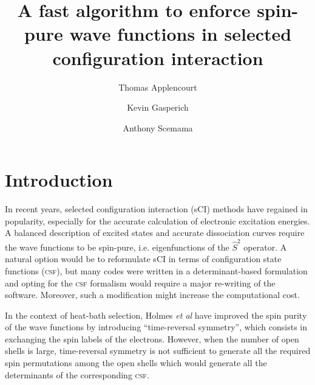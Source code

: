 \documentclass[aip,jcp,reprint,showkeys]{revtex4-1}
\newcommand{\stwo}{\hat{S}^2}
\newcommand{\csf}{\textsc{csf}}
\begin{document}
\title{A fast algorithm to enforce spin-pure wave functions in selected configuration interaction}

\author{Thomas Applencourt}
\author{Kevin Gasperich}
\author{Anthony Scemama}

\begin{abstract}
\end{abstract}


\maketitle

\section{Introduction}

In recent years, selected configuration interaction (sCI) methods have regained in
popularity,\cite{Greer_1998,Stampfuss_2005,Bytautas_2009,Booth_2009,Giner_2013,Buenker_2014,Holmes_2016,Ohtsuka_2017,Coe_2018}
especially for the accurate calculation of electronic excitation
energies.\cite{Coe_2013,Schriber_2017,Holmes_2017,Loos_2018,Scemama_2018,Dash_2018}
A balanced description of excited states and accurate dissociation curves require
the wave functions to be spin-pure, i.e. eigenfunctions of the $\stwo$
operator. A natural option would be to reformulate sCI in terms of
configuration state functions (\csf), but many codes were written in a
determinant-based formulation and opting for the {\csf} formalism would require
a major re-writing of the software. Moreover, such a modification might
increase the computational cost.\cite{Knowles_1984,Olsen_1988}

In the context of heat-bath selection, Holmes \textit{et al} have 
improved the spin purity of the wave functions by introducing ``time-reversal
symmetry''\cite{Holmes_2017}, which consists in exchanging the spin labels of
the electrons. 
However, when the number of open shells is large, time-reversal symmetry is not
sufficient to generate all the required spin permutations among the open shells
which would generate all the determinants of the corresponding \csf.
\end{document}
